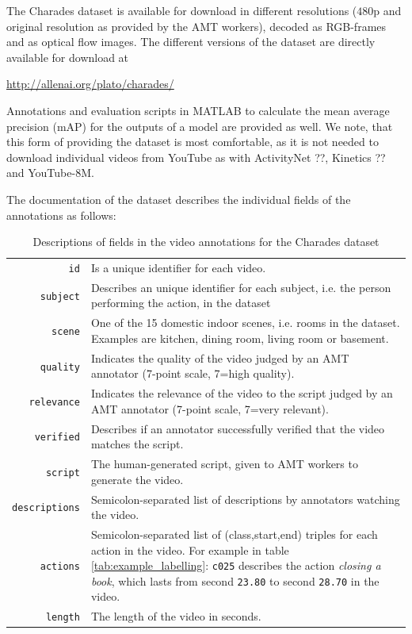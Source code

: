 The Charades dataset is available for download in different resolutions ($480$p and original resolution as provided by the AMT workers), decoded as RGB-frames and as optical flow images.
The different versions of the dataset are directly available for download at

\begin{center}
\url{http://allenai.org/plato/charades/}
\end{center}

Annotations and evaluation scripts in MATLAB to calculate the mean average precision (mAP) for the outputs of a model are provided as well.
We note, that this form of providing the dataset is most comfortable, as it is not needed to download individual videos from YouTube as with ActivityNet ??, Kinetics ?? and YouTube-8M.

The documentation of the dataset describes the individual fields of the annotations as follows:
\begin{table}[H]
    \centering
    \begin{tabularx}{\textwidth}{r X}
        \texttt{id} & Is a unique identifier for each video.\\
        \texttt{subject} & Describes an unique identifier for each subject, i.e. the person performing the action, in the dataset\\
        \texttt{scene} & One of the 15 domestic indoor scenes, i.e. rooms in the dataset. Examples are kitchen, dining room, living room or basement.\\
        \texttt{quality} & Indicates the quality of the video judged by an AMT annotator (7-point scale, 7=high quality).\\
        \texttt{relevance} & Indicates the relevance of the video to the script judged by an AMT annotator (7-point scale, 7=very relevant).\\
        \texttt{verified} & Describes if an annotator successfully verified that the video matches the script.\\
        \texttt{script} & The human-generated script, given to AMT workers to generate the video.\\
        \texttt{descriptions} & Semicolon-separated list of descriptions by annotators watching the video.\\
        \texttt{actions} & Semicolon-separated list of (class,start,end) triples for each action in the video. For example in table \ref{tab:example_labelling}: \texttt{c025} describes the action \textit{closing a book}, which lasts from second \texttt{23.80} to second \texttt{28.70} in the video.\\
        \texttt{length} & The length of the video in seconds.\\
    \end{tabularx}
    \caption{Descriptions of fields in the video annotations for the Charades dataset \cite{sigurdsson_hollywood_2016}}
    \label{tab:annotations_explained}
\end{table}

